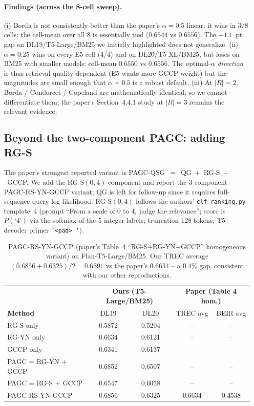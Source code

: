 \documentclass[sigconf]{acmart}
\begin{document}
\paragraph{Findings (across the 8-cell sweep).}
(i) Borda is not consistently better than the paper's
$\alpha{=}0.5$ linear: it wins in 3/8 cells; the cell-mean over
all 8 is essentially tied ($0.6544$ vs $0.6556$). The $+1.1$~pt
gap on DL19/T5-Large/BM25 we initially highlighted does not
generalize.
(ii) $\alpha{=}0.25$ wins on every E5 cell (4/4) and on
DL20/T5-XL/BM25, but loses on BM25 with smaller models; cell-mean
$0.6550$ vs $0.6556$. The optimal-$\alpha$ \emph{direction} is
thus retrieval-quality-dependent (E5 wants more GCCP weight) but
the magnitudes are small enough that $\alpha{=}0.5$ is a robust
default.
(iii) At $|R|=2$, Borda / Condorcet / Copeland are mathematically
identical, so we cannot differentiate them; the paper's
Section~4.4.1 study at $|R|=3$ remains the relevant evidence.

\subsection{Beyond the two-component PAGC: adding RG-S}
\label{sec:pagc_qsg}

The paper's strongest reported variant is
PAGC-QSG~$=$~QG~$+$~RG-S~$+$~GCCP. We add the RG-S$(0,4)$ component
and report the 3-component PAGC-RS-YN-GCCP variant; QG is left for
follow-up since it requires full-sequence query log-likelihood.
RG-S$(0,4)$ follows the authors' \texttt{clf\_ranking.py} template~4
(prompt ``From a scale of 0 to 4, judge the relevance''; score is
$P(\text{`4'})$ via the softmax of the 5 integer labels;
truncation 128 tokens; T5 decoder primer \texttt{`<pad> '}).

\begin{table}[t]
\centering
\small
\begin{tabular}{lcc|cc}
\toprule
& \multicolumn{2}{c}{\textbf{Ours (T5-Large/BM25)}}
& \multicolumn{2}{c}{\textbf{Paper (Table 4 hom.)}} \\
\textbf{Method}        & DL19 & DL20 & TREC avg & BEIR avg \\
\midrule
RG-S only              & 0.5872 & 0.5204 & --     & --     \\
RG-YN only             & 0.6634 & 0.6121 & --     & --     \\
GCCP only              & 0.6341 & 0.6137 & --     & --     \\
PAGC = RG-YN $+$ GCCP  & 0.6852 & 0.6507 & --     & --     \\
PAGC = RG-S $+$ GCCP   & 0.6547 & 0.6058 & --     & --     \\
PAGC-RS-YN-GCCP        & 0.6856 & 0.6325 & 0.6634 & 0.4538 \\
\bottomrule
\end{tabular}
\caption{PAGC-RS-YN-GCCP (paper's Table~4 ``RG-S+RG-YN+GCCP''
homogeneous variant) on Flan-T5-Large/BM25. Our TREC average
$(0.6856 + 0.6325)/2 = 0.6591$ vs the paper's $0.6634$ -- a
$0.4\%$ gap, consistent with our other reproductions.}
\label{tab:pagc_rs}
\end{table}
\end{document}
